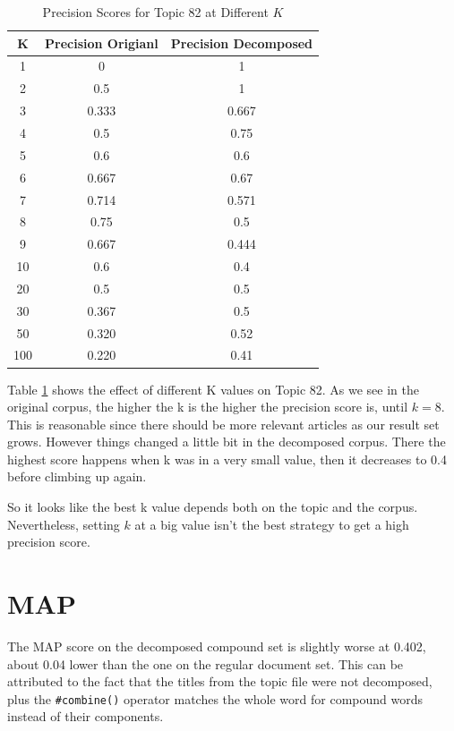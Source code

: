 \documentclass[11pt]{article} %
\begin{document}
\begin{table}[h]
    \begin{center}
        \begin{tabular}{c|c|c|}
            \textbf{K} & \textbf{Precision Origianl} & \textbf{Precision Decomposed} \\
            \hline
            1  & 0 & 1 \\
            2  & 0.5 & 1 \\
            3  & 0.333 & 0.667 \\
            4  & 0.5 & 0.75 \\
            5  & 0.6 & 0.6 \\
            6  & 0.667 & 0.67 \\
            7  & 0.714 & 0.571 \\
            8  & 0.75 & 0.5 \\
            9  & 0.667 & 0.444 \\
            10  & 0.6 & 0.4 \\
            20  & 0.5 & 0.5 \\
            30  & 0.367 & 0.5 \\
            50  & 0.320 & 0.52 \\
            100  & 0.220 & 0.41 \\
        \end{tabular}
        \label{tab_k_value}
        \caption{Precision Scores for Topic 82 at Different $K$}
    \end{center}
\end{table}

Table \ref{tab_k_value} shows the effect of different K values on Topic 82. As we see in the original corpus, the higher the k is the higher the precision score is, until $k=8$. This is reasonable since there should be more relevant articles as our result set grows. However things changed a little bit in the decomposed corpus. There the highest score happens when k was in a very small value, then it decreases to 0.4 before climbing up again.

So it looks like the best k value depends both on the topic and the corpus. Nevertheless, setting $k$ at a big value isn't the best strategy to get a high precision score.

\section{MAP}
The MAP score on the decomposed compound set is slightly worse at 0.402, about 0.04 lower than the one on the regular document set. This can be attributed to the fact that the titles from the topic file were not decomposed, plus the \verb|#combine()| operator matches the whole word for compound words instead of their components.
\end{document}
